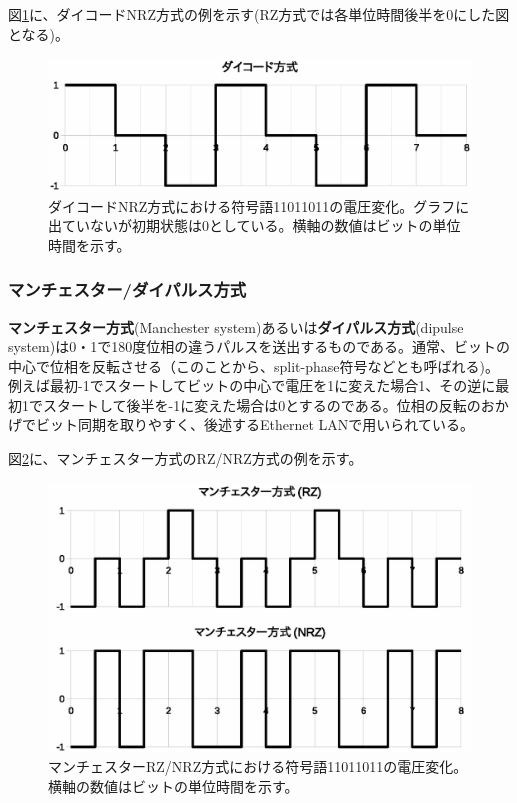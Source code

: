 図\ref{fig5_4}に、ダイコードNRZ方式の例を示す(RZ方式では各単位時間後半を0にした図となる)。
\begin{figure}[htbp]
\centering
\includegraphics[width=0.8\linewidth,keepaspectratio]{fig/fig5_4.eps}
\caption{ダイコードNRZ方式における符号語11011011の電圧変化。グラフに出ていないが初期状態は0としている。横軸の数値はビットの単位時間を示す。}
\label{fig5_4}
\end{figure}


\subsubsection{マンチェスター/ダイパルス方式}
\textbf{マンチェスター方式}(Manchester system)あるいは\textbf{ダイパルス方式}(dipulse system)は0・1で180度位相の違うパルスを送出するものである。通常、ビットの中心で位相を反転させる（このことから、split-phase符号などとも呼ばれる)。例えば最初-1でスタートしてビットの中心で電圧を1に変えた場合1、その逆に最初1でスタートして後半を-1に変えた場合は0とするのである。位相の反転のおかげでビット同期を取りやすく、後述するEthernet LANで用いられている。

図\ref{fig5_5}に、マンチェスター方式のRZ/NRZ方式の例を示す。
\begin{figure}[htbp]
\centering
\includegraphics[width=0.8\linewidth,keepaspectratio]{fig/fig5_5.eps}
\caption{マンチェスターRZ/NRZ方式における符号語11011011の電圧変化。横軸の数値はビットの単位時間を示す。}
\label{fig5_5}
\end{figure}
    

